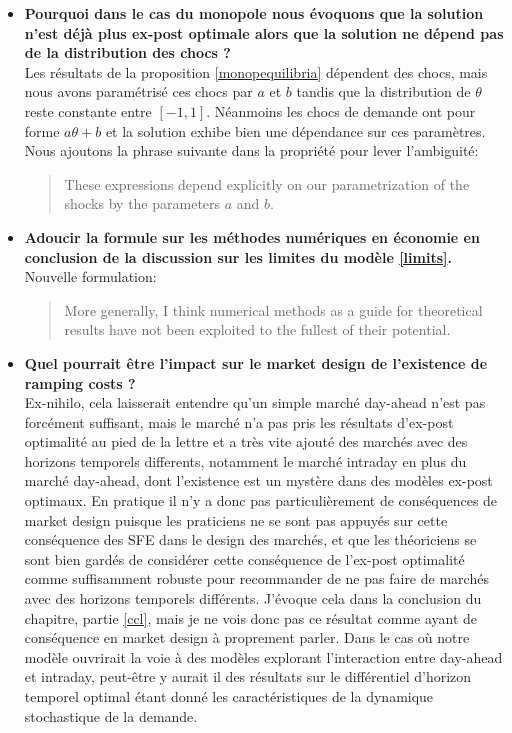 \documentclass{article}
\begin{document}
\begin{itemize}
\item \textbf{Pourquoi dans le cas du monopole nous évoquons que la solution n'est déjà plus ex-post optimale alors que la solution ne dépend pas de la distribution des chocs ?}\\

Les résultats de la proposition \ref{monopequilibria} dépendent des chocs, mais nous avons paramétrisé ces chocs par $a$ et $b$ tandis que la distribution de $\theta$ reste constante entre $[-1,1]$. Néanmoins les chocs de demande ont pour forme $a\theta +b$ et la solution exhibe bien une dépendance sur ces paramètres. Nous ajoutons la phrase suivante dans la propriété pour lever l'ambiguité:

\begin{quote}
These expressions depend explicitly on our parametrization of the shocks by the parameters $a$ and $b$.
\end{quote}

\item \textbf{Adoucir la formule sur les méthodes numériques en économie en conclusion de la discussion sur les limites du modèle \ref{limits}.}\\

Nouvelle formulation:

\begin{quote}
More generally, I think numerical methods as a guide for theoretical results have not been exploited to the fullest of their potential.  
\end{quote}

\item \textbf{Quel pourrait être l'impact sur le market design de l'existence de ramping costs ?}\\

Ex-nihilo, cela laisserait entendre qu'un simple marché day-ahead n'est pas forcément suffisant, mais le marché n'a pas pris les résultats d'ex-post optimalité au pied de la lettre et a très vite ajouté des marchés avec des horizons temporels differents, notamment le marché intraday en plus du marché day-ahead, dont l'existence est un mystère dans des modèles ex-post optimaux. En pratique il n'y a donc pas particulièrement de conséquences de market design puisque les praticiens ne se sont pas appuyés sur cette conséquence des SFE dans le design des marchés, et que les théoriciens se sont bien gardés de considérer cette conséquence de l'ex-post optimalité comme suffisamment robuste pour recommander de ne pas faire de marchés avec des horizons temporels différents. J'évoque cela dans la conclusion du chapitre, partie \ref{ccl}, mais je ne vois donc pas ce résultat comme ayant de conséquence en market design à proprement parler. Dans le cas où notre modèle ouvrirait la voie à des modèles explorant l'interaction entre day-ahead et intraday, peut-être y aurait il des résultats sur le différentiel d'horizon temporel optimal étant donné les caractéristiques de la dynamique stochastique de la demande.
\end{itemize}
\end{document}
